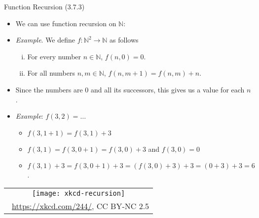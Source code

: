 \documentclass[../slides.tex]{subfiles}
\begin{document}
\begin{frame}{Function Recursion (3.7.3)}

	\begin{itemize}
	
		\item We can use function recursion on $\mathbb{N}$:
		
		\item \emph{Example}. We define $f:\mathbb{N}^2\to\mathbb{N}$ as follows
	\begin{enumerate}[(i)]
	
		\item For every number $n\in\mathbb{N}$, $f(n, 0)=0$.
		
		\item For all numbers $n,m\in\mathbb{N}$, $f(n,m+1)=f(n,m)+n$.
	
	\end{enumerate}
	
	\item Since the numbers are $0$ and all its successors, this gives us a value for each $n$.
	
	\item \emph{Example}: $f(3,2)=\dots$
	
	\begin{itemize}
		
		\item $f(3,1+1)=f(3, 1)+3$
		
		\item $f(3,1)=f(3,0+1)=f(3,0)+3$ and $f(3, 0)=0$
			
		\item $f(3,1)+3=f(3,0+1)+3=(f(3, 0)+3)+3=(0+3)+3=6$.
	
	\end{itemize}

		
	\end{itemize}
	
	\begin{center}
		\begin{tabular}{c}
		\texttt{[image: xkcd-recursion]}\\[-1ex]
		{\tiny \textcopyright~\url{https://xkcd.com/244/}, CC BY-NC 2.5}
		\end{tabular}
		\end{center}

\end{frame}
\end{document}
